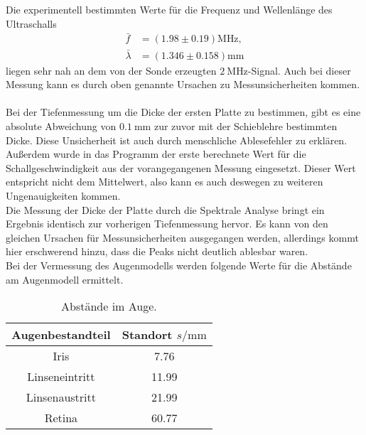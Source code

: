 Die experimentell bestimmten Werte für die Frequenz und Wellenlänge des Ultraschalls
\begin{align*}
    \bar{f} &= (1.98 \pm 0.19) \si{\mega\hertz},\\
    \bar{\lambda} &= (1.346 \pm 0.158) \si{\milli\meter}
\end{align*}
liegen sehr nah an dem von der Sonde erzeugten $\qty{2}{\mega\hertz}$-Signal.
Auch bei dieser Messung kann es durch oben genannte Ursachen zu Messunsicherheiten kommen.\\
\\
Bei der Tiefenmessung um die Dicke der ersten Platte zu bestimmen, gibt es eine absolute Abweichung von $\qty{0.1}{\milli\meter}$ zur 
zuvor mit der Schieblehre bestimmten Dicke. Diese Unsicherheit ist auch durch menschliche Ablesefehler zu erklären.
Außerdem wurde in das Programm der erste berechnete Wert für die Schallgeschwindigkeit aus der vorangegangenen Messung eingesetzt.
Dieser Wert entspricht nicht dem Mittelwert, also kann es auch deswegen zu weiteren Ungenauigkeiten kommen.\\


Die Messung der Dicke der Platte durch die Spektrale Analyse bringt ein Ergebnis identisch zur vorherigen Tiefenmessung hervor.
Es kann von den gleichen Ursachen für Messunsicherheiten ausgegangen werden, allerdings kommt hier erschwerend hinzu, dass die Peaks 
nicht deutlich ablesbar waren.\\

Bei der Vermessung des Augenmodells werden folgende Werte für die Abstände am Augenmodell ermittelt.
\begin{table}[H]
    \centering
    \caption{Abstände im Auge.}
    \label{tab:Auge}
    \begin{tabular}{c S[table-format=2.2] }
    \toprule
    {Augenbestandteil} & {Standort $s / \si{\milli\meter}$} \\
    \midrule
    Iris            &  7.76\\
    Linseneintritt  &  11.99\\
    Linsenaustritt  &  21.99\\
    Retina          &  60.77\\
    \bottomrule
    \end{tabular}
 \end{table}

